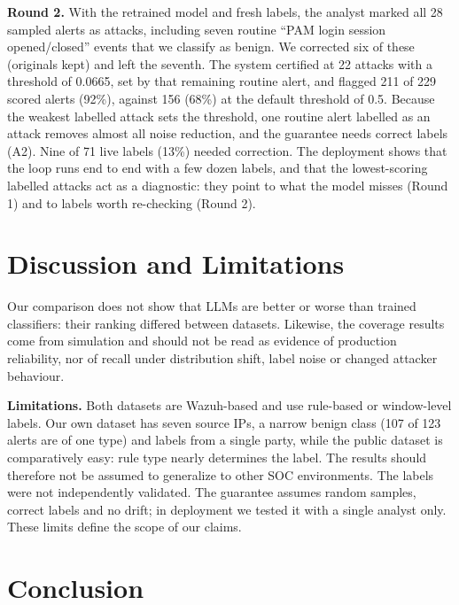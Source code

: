 \documentclass[conference]{IEEEtran}
\begin{document}
\textbf{Round 2.} With the retrained model and fresh labels, the analyst marked all 28 sampled
alerts as attacks, including seven routine ``PAM login session opened/closed'' events that we
classify as benign. We corrected six of these (originals kept) and left
the seventh. The system certified at 22 attacks with a threshold of 0.0665, set by that remaining
routine alert, and flagged 211 of 229 scored alerts (92\%), against 156 (68\%) at the default
threshold of 0.5. Because the weakest labelled attack sets the threshold, one routine alert labelled as an attack
removes almost all noise reduction, and the guarantee needs correct labels (A2). Nine of 71 live labels (13\%) needed correction.
The deployment shows that the loop runs end to end with a few dozen labels, and that the lowest-scoring labelled attacks act as a diagnostic: they point to what the model misses (Round 1) and to labels worth re-checking (Round 2).

\section{Discussion and Limitations}

Our comparison does not show that LLMs are better or worse than trained classifiers: their ranking differed between datasets. Likewise, the coverage results come from
simulation and should not be read as evidence of production reliability, nor of recall under
distribution shift, label noise or changed attacker behaviour.

\textbf{Limitations.} Both datasets are Wazuh-based and use rule-based or window-level labels.
Our own dataset has seven source IPs, a narrow benign class (107 of 123 alerts are of one type) and
labels from a single party, while the public dataset is comparatively easy: rule type nearly
determines the label. The results should therefore not be assumed to generalize to
other SOC environments. The labels were not independently validated. The guarantee
assumes random samples, correct labels and no drift; in deployment we tested it with a single
analyst only. These limits define the scope of our claims.

\section{Conclusion}
\end{document}
